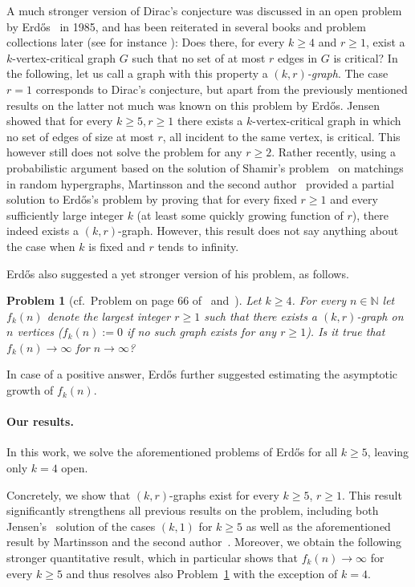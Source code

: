 \documentclass[a4paper,10pt,hidelinks]{amsart}
\newtheorem{problem}[theorem]{Problem}
\theoremstyle{definition}
\begin{document}
A much stronger version of Dirac's conjecture was discussed in an open problem by Erd\H{o}s~\cite{erdos} in 1985, and has been reiterated in several books and problem collections later (see for instance \cite{chungraham,jensentoft,bloom,chungrahamonline}): Does there, for every $k\ge 4$ and $r\ge 1$, exist a $k$-vertex-critical graph $G$ such that no set of at most $r$ edges in $G$ is critical? In the following, let us call a graph with this property a \emph{$(k,r)$-graph}. The case $r=1$ corresponds to Dirac's conjecture, but apart from the previously mentioned results on the latter not much was known on this problem by Erd\H{o}s. Jensen~\cite{jensen} showed that for every $k\ge 5, r\ge 1$ there exists a $k$-vertex-critical graph in which no set of edges of size at most $r$, all incident to the same vertex, is critical. This however still does not solve the problem for any $r\ge 2$. Rather recently, using a probabilistic argument based on the solution of Shamir's problem~\cite{kahn,parkpham} on matchings in random hypergraphs, Martinsson and the second author~\cite{martinsson} provided a partial solution to Erd\H{o}s's problem by proving that for every fixed $r\ge 1$ and every sufficiently large integer $k$ (at least some quickly growing function of $r$), there indeed exists a $(k,r)$-graph. However, this result does not say anything about the case when $k$ is fixed and $r$ tends to infinity.

Erd\H{o}s also suggested a yet stronger version of his problem, as follows. 

\begin{problem}[cf.~Problem on page 66 of~\cite{chungraham} and~\cite{chungrahamonline, erdos}]\label{prob2}
Let $k\ge 4$. For every $n\in \mathbb{N}$ let $f_k(n)$ denote the largest integer $r\ge 1$ such that there exists a $(k,r)$-graph on $n$ vertices ($f_k(n):=0$ if no such graph exists for any $r\ge 1$). Is it true that $f_k(n)\rightarrow \infty$ for $n\rightarrow \infty$?
\end{problem}
In case of a positive answer, Erd\H{o}s further suggested estimating the asymptotic growth of $f_k(n)$. 

\medskip

\paragraph*{\textbf{Our results.}} In this work, we solve the aforementioned problems of Erd\H{o}s for all $k\ge 5$, leaving only $k=4$ open. 

Concretely, we show that $(k,r)$-graphs exist for every $k\ge 5$, $r\ge 1$. This result significantly strengthens all previous results on the problem, including both Jensen's~\cite{jensen} solution of the cases $(k,1)$ for $k\ge 5$ as well as the aforementioned result by Martinsson and the second author~\cite{martinsson}. Moreover, we obtain the following stronger quantitative result, which in particular shows that $f_k(n)\rightarrow \infty$ for every $k\ge 5$ and thus resolves also Problem~\ref{prob2} with the exception of $k=4$. 
\end{document}
